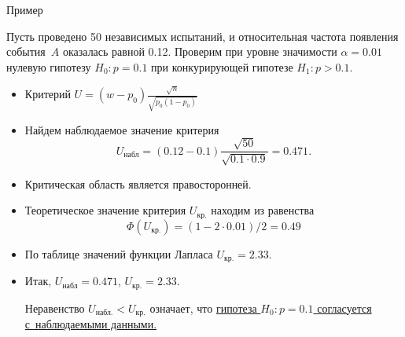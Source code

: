 \documentclass[unicode,11pt,notheorems,xcolor=table]{beamer}
\begin{document}
\begin{frame}[allowframebreaks]{Пример}{}
    \begin{exampleblock}{}
    Пусть проведено 50 независимых испытаний, и относительная частота появления события~$A$ оказалась равной 0.12.
    Проверим при уровне значимости $\alpha = 0.01$ нулевую гипотезу $H_0\colon p = 0.1$ при конкурирующей гипотезе $H_1\colon p >0.1$.
    \end{exampleblock}
    \begin{itemize}
        \item Критерий $U=(w-p_0)\frac{\sqrt{n}}{\sqrt{p_0(1-p_0)}}$
        \item Найдем  наблюдаемое значение критерия
        $$
            U_\text{набл} = (0.12-0.1)\dfrac{\sqrt{50}}{\sqrt{0.1\cdot 0.9}}=0.471.
        $$
        \item Критическая область является правосторонней.
        \item Теоретическое значение критерия $U_\text{кр.}$ находим из равенства 
        $$
        \Phi(U_\text{кр.}) =  (1-2\cdot 0.01)/2 = 0.49 
        $$
        \item По таблице значений функции Лапласа $U_\text{кр.} =  2.33$. 
        \item Итак,  $U_\text{набл}=0.471$, $U_\text{кр.} =  2.33$.
        
        Неравенство $U_\text{набл.}< U_\text{кр.}$ означает, что 
        \underline{гипотеза $H_0\colon p = 0.1$ согласуется с~наблюдаемыми данными.}
    \end{itemize}
 
\end{frame}
\end{document}

